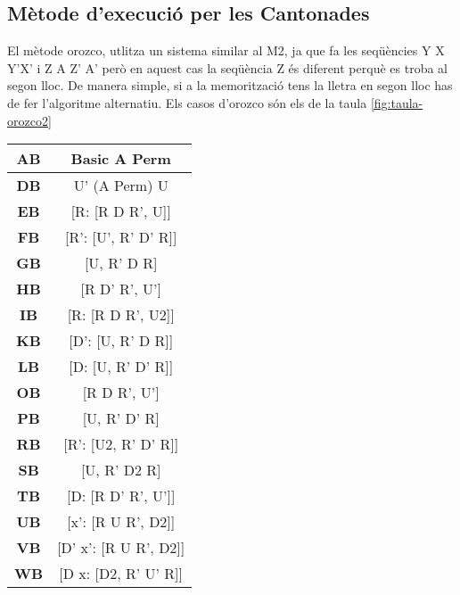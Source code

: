 \subsection{Mètode d'execució per les Cantonades}

El mètode orozco, utlitza un sistema similar al M2, ja que fa les seqüències Y X Y'X' i Z A Z' A' però en aquest cas la seqüència Z és diferent perquè es troba al segon lloc. De manera simple, si a la memorització tens la lletra en segon lloc has de fer l'algoritme alternatiu.
Els casos d'orozco són els de la taula \ref{fig:taula-orozco2}

\begin{table}[!h]
    \begin{minipage}{.5\linewidth}
        \centering
        \begin{tabular}{|c|c|} 
            \hline
            \textbf{AB} & Basic A Perm \\
            \hline
            \textbf{DB} & U' (A Perm) U \\
            \hline
            \textbf{EB} & [R: [R D R', U]] \\
            \hline
            \textbf{FB} & [R': [U', R' D' R]] \\
            \hline
            \textbf{GB} & [U, R' D R] \\
            \hline
            \textbf{HB} & [R D' R', U'] \\
            \hline
            \textbf{IB} & [R: [R D R', U2]] \\
            \hline
            \textbf{KB} & [D': [U, R' D R]] \\
            \hline
            \textbf{LB} & [D: [U, R' D' R]] \\
            \hline
            \textbf{OB} & [R D R', U'] \\
            \hline
            \textbf{PB} & [U, R' D' R] \\
            \hline
            \textbf{RB} & [R': [U2, R' D' R]] \\
            \hline
            \textbf{SB} & [U, R' D2 R] \\
            \hline
            \textbf{TB} & [D: [R D' R', U']] \\
            \hline
            \textbf{UB} & [x': [R U R', D2]] \\
            \hline
            \textbf{VB} & [D' x': [R U R', D2]] \\
            \hline
            \textbf{WB} & [D x: [D2, R' U' R]] \\

\end{tabular}
\end{minipage}
\end{table}
